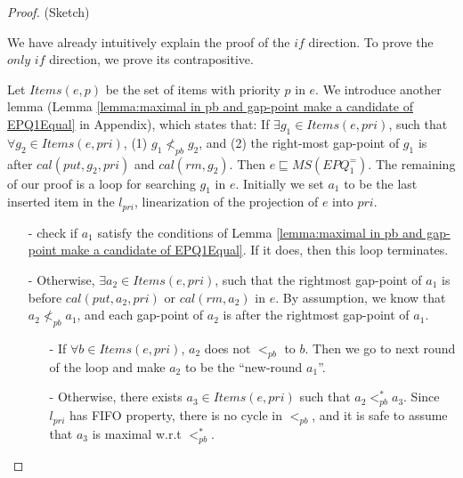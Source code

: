 \begin {proof} (Sketch)

We have already intuitively explain the proof of the $\textit{if}$ direction. To prove the $\textit{only if}$ direction, we prove its contrapositive. %

Let $\textit{Items}(e,p)$ be the set of items with priority $p$ in $e$. We introduce another lemma (Lemma \ref{lemma:maximal in pb and gap-point make a candidate of EPQ1Equal} in Appendix), which states that: If $\exists g_1 \in \textit{Items}(e,\textit{pri})$, such that $\forall g_2 \in \textit{Items}(e,\textit{pri})$, (1) $g_1 \nless_{\textit{pb}} g_2$, and (2) the right-most gap-point of $g_1$ is after $\textit{cal}(\textit{put},g_2,\textit{pri})$ and $\textit{cal}(\textit{rm},g_2)$. Then $e \sqsubseteq \textit{MS}(\textit{EPQ}_1^{=})$. %
The remaining of our proof is a loop for searching $g_1$ in $e$. Initially we set $a_1$ to be the last inserted item in the $l_{\textit{pri}}$, linearization of the projection of $e$ into $\textit{pri}$.

\begin{itemize}
\setlength{\itemsep}{0.5pt}
\item[-] check if $a_1$ satisfy the conditions of Lemma \ref{lemma:maximal in pb and gap-point make a candidate of EPQ1Equal}. If it does, then this loop terminates.

\item[-] Otherwise, $\exists a_2 \in \textit{Items}(e,\textit{pri})$, such that the rightmost gap-point of $a_1$ is before $\textit{cal}(\textit{put},a_2,\textit{pri})$ or $\textit{cal}(\textit{rm},a_2)$ in $e$. By assumption, we know that $a_2 \nless_{\textit{pb}} a_1$, and each gap-point of $a_2$ is after the rightmost gap-point of $a_1$.

    \begin{itemize}
    \setlength{\itemsep}{0.5pt}
    \item[-] If $\forall b \in \textit{Items}(e,\textit{pri})$, $a_2$ does not $<_{\textit{pb}}$ to $b$. Then we go to next round of the loop and make $a_2$ to be the ``new-round $a_1$''.
    \item[-] Otherwise, there exists $a_3 \in \textit{Items}(e,\textit{pri})$ such that $a_2 <_{\textit{pb}}^* a_3$. Since $l_{\textit{pri}}$ has FIFO property, there is no cycle in $<_{\textit{pb}}$, and it is safe to assume that $a_3$ is maximal w.r.t $<_{\textit{pb}}^*$.


\end{itemize}
\end{itemize}
\end{proof}
